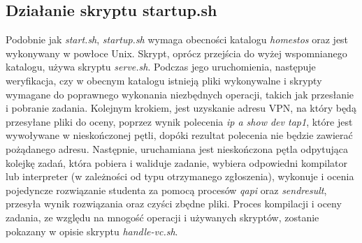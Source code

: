 \subsection{Działanie skryptu startup.sh}
Podobnie jak \textit{start.sh}, \textit{startup.sh} wymaga obecności katalogu \textit{\/home\/stos} oraz jest wykonywany w powłoce Unix. Skrypt, oprócz przejścia do wyżej wspomnianego katalogu, używa skryptu \textit{serve.sh}. Podczas jego uruchomienia, następuje weryfikacja, czy w obecnym katalogu istnieją pliki wykonywalne i skrypty wymagane do poprawnego wykonania niezbędnych operacji, takich jak przesłanie i pobranie zadania. Kolejnym krokiem, jest uzyskanie adresu VPN, na który będą przesyłane pliki do oceny, poprzez wynik polecenia \textit{ip a show dev tap1}\cite{ip_addr}, które jest wywoływane w nieskończonej pętli, dopóki rezultat polecenia nie będzie zawierać pożądanego adresu. Następnie, uruchamiana jest nieskończona pętla odpytująca kolejkę zadań, która pobiera i waliduje zadanie, wybiera odpowiedni kompilator lub interpreter (w zależności od typu otrzymanego zgłoszenia), wykonuje i ocenia pojedyncze rozwiązanie studenta za pomocą procesów \textit{qapi} oraz \textit{sendresult}, przesyła wynik rozwiązania oraz czyści zbędne pliki. Proces kompilacji i oceny zadania, ze względu na mnogość operacji i używanych skryptów, zostanie pokazany w opisie skryptu \textit{handle-vc.sh}. 
